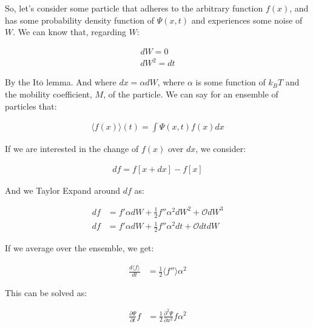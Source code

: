 \documentclass[12pt]{report}
\begin{document}
So, let's consider some particle that adheres to the arbitrary function $f(x)$, and has some probability density function of $\Psi(x,t)$ and experiences some noise of $W$. We can know that, regarding $W$:

\begin{equation}
\begin{split}
    dW = 0 \\
    dW^2 = dt
\end{split}
\end{equation}

By the It$\overline{\mathrm{o}}$ lemma. And where $dx = \alpha dW$, where $\alpha$ is some function of $k_BT$ and the mobility coefficient, $M$, of the particle. We can say for an ensemble of particles that: 

\begin{equation}
\begin{split}
    \langle f(x) \rangle(t) = \int \Psi(x,t) f(x) dx
\end{split}
\end{equation}

If we are interested in the change of $f(x)$ over $dx$, we consider: 

\begin{equation}
\begin{split}
    df = f[x + dx] - f[x] 
\end{split}
\end{equation}

And we Taylor Expand around $df$ as: 

\begin{equation}
\begin{split}
    df & = f'\alpha dW + \frac{1}{2}f''\alpha^2 dW^2 + \mathcal{O}dW^3 \\
    df & = f'\alpha dW + \frac{1}{2}f''\alpha^2 dt + \mathcal{O}dtdW
\end{split}
\end{equation}

If we average over the ensemble, we get: 

\begin{equation}
\begin{split}
    \frac{d\langle f \rangle}{dt} & = \frac{1}{2}\langle f'' \rangle \alpha^2 
\end{split}
\end{equation}

This can be solved as: 

\begin{equation}
\begin{split}
    \frac{\partial \Psi}{\partial t}f & = \frac{1}{2} \frac{\partial^2 \Psi}{\partial x^2}f \alpha^2
\end{split}
\end{equation}
\end{document}
